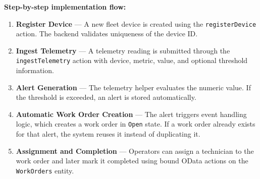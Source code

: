 \documentclass[a4paper,12pt]{article}
\begin{document}
\begin{center}
\end{center}

\textbf{Step-by-step implementation flow:}

\begin{enumerate}[leftmargin=1.8em, itemsep=4pt]
  \item \textbf{Register Device} --- A new fleet device is created using the \texttt{registerDevice} action. The backend validates uniqueness of the device ID.

  \item \textbf{Ingest Telemetry} --- A telemetry reading is submitted through the \texttt{ingestTelemetry} action with device, metric, value, and optional threshold information.

  \item \textbf{Alert Generation} --- The telemetry helper evaluates the numeric value. If the threshold is exceeded, an alert is stored automatically.

  \item \textbf{Automatic Work Order Creation} --- The alert triggers event handling logic, which creates a work order in \texttt{Open} state. If a work order already exists for that alert, the system reuses it instead of duplicating it.

  \item \textbf{Assignment and Completion} --- Operators can assign a technician to the work order and later mark it completed using bound OData actions on the \texttt{WorkOrders} entity.
\end{enumerate}
\end{document}
